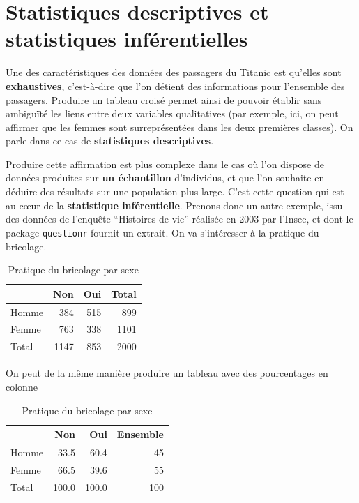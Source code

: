 \documentclass[
  french,
]{book}
\begin{document}
\hypertarget{statistiques-descriptives-et-statistiques-infuxe9rentielles}{%
\section{Statistiques descriptives et statistiques inférentielles}\label{statistiques-descriptives-et-statistiques-infuxe9rentielles}}

Une des caractéristiques des données des passagers du Titanic est qu'elles sont \textbf{exhaustives}, c'est-à-dire que l'on détient des informations pour l'ensemble des passagers. Produire un tableau croisé permet ainsi de pouvoir établir sans ambiguïté les liens entre deux variables qualitatives (par exemple, ici, on peut affirmer que les femmes sont surreprésentées dans les deux premières classes). On parle dans ce cas de \textbf{statistiques descriptives}.

Produire cette affirmation est plus complexe dans le cas où l'on dispose de données produites sur \textbf{un échantillon} d'individus, et que l'on souhaite en déduire des résultats sur une population plus large. C'est cette question qui est au cœur de la \textbf{statistique inférentielle}. Prenons donc un autre exemple, issu des données de l'enquête ``Histoires de vie'' réalisée en 2003 par l'Insee, et dont le package \texttt{questionr} fournit un extrait. On va s'intéresser à la pratique du bricolage.

\begin{table}

\caption{\label{tab:unnamed-chunk-21}Pratique du bricolage par sexe}
\centering
\begin{tabular}[t]{l|r|r|r}
\hline
  & Non & Oui & Total\\
\hline
Homme & 384 & 515 & 899\\
\hline
Femme & 763 & 338 & 1101\\
\hline
Total & 1147 & 853 & 2000\\
\hline
\end{tabular}
\end{table}

On peut de la même manière produire un tableau avec des pourcentages en colonne

\begin{table}

\caption{\label{tab:unnamed-chunk-22}Pratique du bricolage par sexe}
\centering
\begin{tabular}[t]{l|r|r|r}
\hline
  & Non & Oui & Ensemble\\
\hline
Homme & 33.5 & 60.4 & 45\\
\hline
Femme & 66.5 & 39.6 & 55\\
\hline
Total & 100.0 & 100.0 & 100\\
\hline
\end{tabular}
\end{table}
\end{document}
